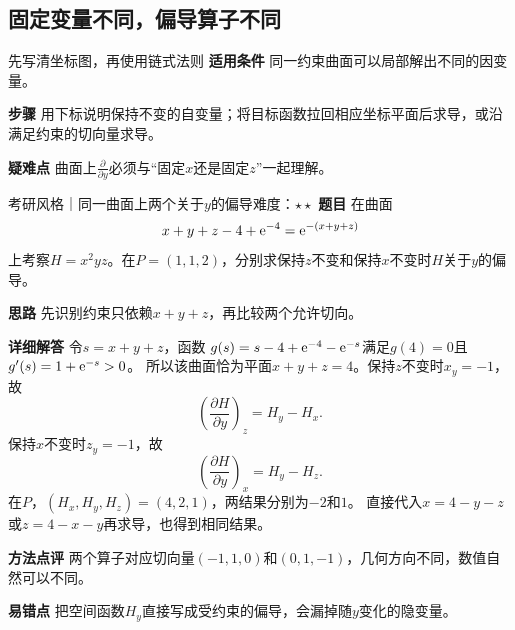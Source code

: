 \subsection{固定变量不同，偏导算子不同}\label{cmv:coordinates}
\begin{method}{先写清坐标图，再使用链式法则}
\textbf{适用条件} 同一约束曲面可以局部解出不同的因变量。\par
\textbf{步骤} 用下标说明保持不变的自变量；将目标函数拉回相应坐标平面后求导，或沿满足约束的切向量求导。\par
\textbf{疑难点} 曲面上$\frac{\partial}{\partial y}$必须与“固定$x$还是固定$z$”一起理解。
\end{method}
\begin{example}{考研风格｜同一曲面上两个关于$y$的偏导}{难度：$\star\star$}
\label{cmv:ex:coordinatepartials}
\textbf{题目} 在曲面
\[
x+y+z-4+\mathrm{e}^{-4}=\mathrm{e}^{-(x+y+z)}
\]
上考察$H=x^2yz$。在$P=(1,1,2)$，分别求保持$z$不变和保持$x$不变时$H$关于$y$的偏导。\par
\textbf{思路} 先识别约束只依赖$x+y+z$，再比较两个允许切向。\par
\textbf{详细解答} 令$s=x+y+z$，函数
$g(s)=s-4+\mathrm{e}^{-4}-\mathrm{e}^{-s}$满足$g(4)=0$且$g'(s)=1+\mathrm{e}^{-s}>0$。
所以该曲面恰为平面$x+y+z=4$。保持$z$不变时$x_y=-1$，故
\[
\left(\dfrac{\partial H}{\partial y}\right)_z
=H_y-H_x.
\]
保持$x$不变时$z_y=-1$，故
\[
\left(\dfrac{\partial H}{\partial y}\right)_x
=H_y-H_z.
\]
在$P$，$(H_x,H_y,H_z)=(4,2,1)$，两结果分别为$-2$和$1$。
直接代入$x=4-y-z$或$z=4-x-y$再求导，也得到相同结果。\par
\textbf{方法点评} 两个算子对应切向量$(-1,1,0)$和$(0,1,-1)$，几何方向不同，数值自然可以不同。\par
\textbf{易错点} 把空间函数$H_y$直接写成受约束的偏导，会漏掉随$y$变化的隐变量。
\end{example}

